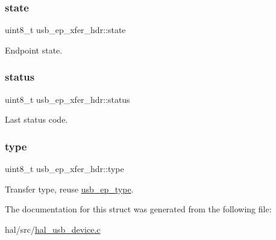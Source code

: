 \subsubsection{\texorpdfstring{state}{state}}
{\footnotesize\ttfamily uint8\+\_\+t usb\+\_\+ep\+\_\+xfer\+\_\+hdr\+::state}

Endpoint state. \mbox{\label{structusb__ep__xfer__hdr_a192941949f60846a43669b6e72fa6617}} 
\subsubsection{\texorpdfstring{status}{status}}
{\footnotesize\ttfamily uint8\+\_\+t usb\+\_\+ep\+\_\+xfer\+\_\+hdr\+::status}

Last status code. \mbox{\label{structusb__ep__xfer__hdr_ae0bc7321662fd12afb1fe80095d15c38}} 
\subsubsection{\texorpdfstring{type}{type}}
{\footnotesize\ttfamily uint8\+\_\+t usb\+\_\+ep\+\_\+xfer\+\_\+hdr\+::type}

Transfer type, reuse \hyperlink{group__usb__protocol__group_ga666def795a15032e5bf93a450f79113f}{usb\+\_\+ep\+\_\+type}. 

The documentation for this struct was generated from the following file\+:\begin{DoxyCompactItemize}
\item 
hal/src/\hyperlink{hal__usb__device_8c}{hal\+\_\+usb\+\_\+device.\+c}\end{DoxyCompactItemize}
